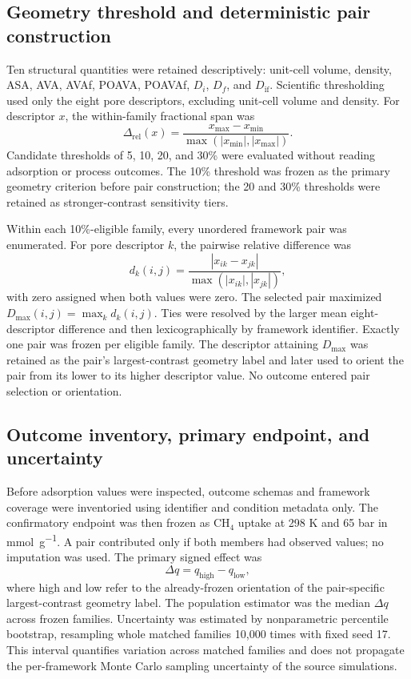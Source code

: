 \documentclass[11pt,a4paper]{article}
\begin{document}
\subsection{Geometry threshold and deterministic pair construction}

Ten structural quantities were retained descriptively: unit-cell volume, density,
ASA, AVA, AVAf, POAVA, POAVAf, $D_i$, $D_f$, and $D_{\mathrm{if}}$.
Scientific thresholding used only the eight pore descriptors, excluding unit-cell
volume and density. For descriptor $x$, the within-family fractional span was
\[
\Delta_{\mathrm{rel}}(x)=
\frac{x_{\max}-x_{\min}}
{\max\left(|x_{\min}|,|x_{\max}|\right)}.
\]
Candidate thresholds of 5, 10, 20, and 30\% were evaluated without reading
adsorption or process outcomes. The 10\% threshold was frozen as the primary
geometry criterion before pair construction; the 20 and 30\% thresholds were
retained as stronger-contrast sensitivity tiers.

Within each 10\%-eligible family, every unordered framework pair was enumerated.
For pore descriptor $k$, the pairwise relative difference was
\[
d_k(i,j)=
\frac{|x_{ik}-x_{jk}|}
{\max\left(|x_{ik}|,|x_{jk}|\right)},
\]
with zero assigned when both values were zero. The selected pair maximized
$D_{\max}(i,j)=\max_k d_k(i,j)$. Ties were resolved by the larger mean
eight-descriptor difference and then lexicographically by framework identifier.
Exactly one pair was frozen per eligible family. The descriptor attaining
$D_{\max}$ was retained as the pair's largest-contrast geometry label and later
used to orient the pair from its lower to its higher descriptor value. No outcome
entered pair selection or orientation.

\subsection{Outcome inventory, primary endpoint, and uncertainty}

Before adsorption values were inspected, outcome schemas and framework coverage
were inventoried using identifier and condition metadata only. The confirmatory
endpoint was then frozen as CH$_4$ uptake at 298 K and 65 bar in
\si{\milli\mole\per\gram}. A pair contributed only if both members had observed
values; no imputation was used. The primary signed effect was
\[
\Delta q=q_{\mathrm{high}}-q_{\mathrm{low}},
\]
where high and low refer to the already-frozen orientation of the pair-specific
largest-contrast geometry label. The population estimator was the median
$\Delta q$ across frozen families. Uncertainty was estimated by nonparametric
percentile bootstrap, resampling whole matched families 10,000 times with fixed
seed 17. This interval quantifies variation across matched families and does not
propagate the per-framework Monte Carlo sampling uncertainty of the source
simulations.
\end{document}
